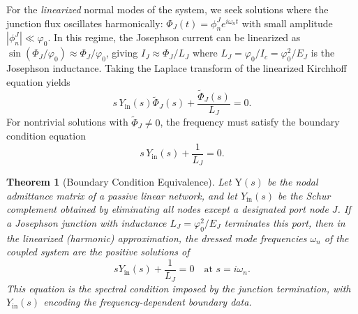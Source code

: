 \documentclass[reprint, floatfix, superscriptaddress, amsmath, amssymb, longbibliography]{revtex4-2}
\newtheorem{theorem}{Theorem}[section]
\begin{document}
For the \emph{linearized} normal modes of the system, we seek solutions where the junction flux oscillates harmonically: $\Phi_J(t) = \phi_n^J e^{i\omega_n t}$ with small amplitude $|\phi_n^J| \ll \varphi_0$. In this regime, the Josephson current can be linearized as $\sin(\Phi_J/\varphi_0) \approx \Phi_J/\varphi_0$, giving $I_J \approx \Phi_J/L_J$ where $L_J = \varphi_0/I_c = \varphi_0^2/E_J$ is the Josephson inductance. Taking the Laplace transform of the linearized Kirchhoff equation yields
\begin{equation}
s \, Y_{\mathrm{in}}(s) \tilde{\Phi}_J(s) + \frac{\tilde{\Phi}_J(s)}{L_J} = 0.
\label{eq:linearized_kcl}
\end{equation}
For nontrivial solutions with $\tilde{\Phi}_J \neq 0$, the frequency must satisfy the boundary condition equation
\begin{equation}
s \, Y_{\mathrm{in}}(s) + \frac{1}{L_J} = 0.
\label{eq:boundary_condition}
\end{equation}

\begin{theorem}[Boundary Condition Equivalence]
\label{thm:bc_equivalence}
Let $\mathrm{Y}(s)$ be the nodal admittance matrix of a passive linear network, and let $Y_{\mathrm{in}}(s)$ be the Schur complement obtained by eliminating all nodes except a designated port node $J$. If a Josephson junction with inductance $L_J = \varphi_0^2/E_J$ terminates this port, then in the linearized (harmonic) approximation, the dressed mode frequencies $\omega_n$ of the coupled system are the positive solutions of
\begin{equation}
sY_{\mathrm{in}}(s) + \frac{1}{L_J} = 0 \quad \text{at } s = i\omega_n.
\end{equation}
This equation is the spectral condition imposed by the junction termination, with $Y_{\mathrm{in}}(s)$ encoding the frequency-dependent boundary data.
\end{theorem}
\end{document}

